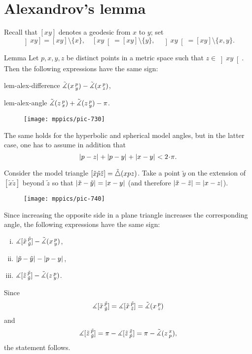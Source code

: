 \section{Alexandrov's lemma}

Recall that $[xy]$ denotes a geodesic from $x$ to $y$;
set  
\[
\left]x y\right]=[xy]\setminus\{x\},
\quad
\left[x y\right[=[xy]\setminus\{y\},
\quad
\left]x y\right[=[xy]\setminus\{x,y\}.\]

\begin{thm}{Lemma}
\label{lem:alex}  
Let $p,x,y,z$ be distinct points in a metric space such that $z\in \left]x y\right[$.
Then 
the following expressions have the same sign:

\begin{subthm}{lem-alex-difference}
$\tilde\measuredangle(x\,{}^{p}_{y})
-\tilde\measuredangle(x\,{}^{p}_{z})$,
\end{subthm} 

\begin{subthm}{lem-alex-angle}
$\tilde\measuredangle(z\,{}^{p}_{x})
+\tilde\measuredangle(z\,{}^{p}_{y}) -\pi$.
\end{subthm}

\begin{wrapfigure}{r}{25mm}
\vskip-6mm
\centering
\texttt{[image: mppics/pic-730]}
\end{wrapfigure}

The same holds for the hyperbolic and spherical model angles, 
but in the latter case, one has to assume in addition that
\[\dist{p}{z}{}+\dist{p}{y}{}+\dist{x}{y}{}< 2\cdot\pi.\]

\end{thm}


Consider the model triangle $[\tilde x\tilde p\tilde z]=\tilde\triangle(x p z)$.
Take 
a point $\tilde y$ on the extension of 
$[\tilde x \tilde z]$ beyond $\tilde z$ so that $\dist{\tilde x}{\tilde y}{}=\dist{x}{y}{}$ (and therefore $\dist{\tilde x}{\tilde z}{}=\dist{x}{z}{}$). 

\begin{wrapfigure}{r}{33mm}
\vskip-0mm
\centering
\texttt{[image: mppics/pic-740]}
\end{wrapfigure}

Since increasing the opposite side in a plane triangle increases the corresponding angle, 
the following expressions have the same sign:
\begin{enumerate}[(i)]
\item $\measuredangle[\tilde x\,{}^{\tilde p}_{\tilde y}]-\tilde\measuredangle(x\,{}^{p}_{y})$,
\item $\dist{\tilde p}{\tilde y}{}-\dist{p}{y}{}$,
\item $\measuredangle[\tilde z\,{}^{\tilde p}_{\tilde y}]-\tilde\measuredangle(z\,{}^{p}_{y})$.
\end{enumerate}
Since 
\[\measuredangle[\tilde x\,{}^{\tilde p}_{\tilde y}]=\measuredangle[\tilde x\,{}^{\tilde p}_{\tilde z}]=\tilde\measuredangle(x\,{}^{p}_{z})\]
and
\[ \measuredangle[\tilde z\,{}^{\tilde p}_{\tilde y}]
=\pi-\measuredangle[\tilde z\,{}^{\tilde x}_{\tilde p}]
=\pi-\tilde\measuredangle(z\,{}^{x}_{p}),\]
the statement follows.

